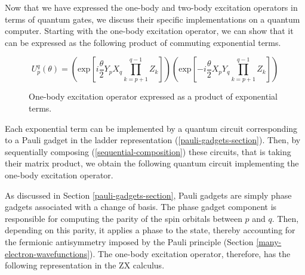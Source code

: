 Now that we have expressed the one-body and two-body excitation operators in terms of quantum gates, we discuss their specific implementations on a quantum computer. Starting with the one-body excitation operator, we can show that it can be expressed as the following product of commuting exponential terms.

\begin{figure}[H]
    \centering
    \begin{equation*}
        U^q_p (\theta) =
        \left( \text{exp} \left[
        i \frac{\theta}{2} Y_p X_q \prod_{k=p+1}^{q-1} Z_k \right] \right)
        \left( \text{exp} \left[ -
        i \frac{\theta}{2} X_p Y_q \prod_{k=p+1}^{q-1} Z_k \right] \right)
    \end{equation*}
    \caption{One-body excitation operator expressed as a product of exponential terms.}
\end{figure}
\vspace{-10pt}

Each exponential term can be implemented by a quantum circuit corresponding to a Pauli gadget in the ladder representation (\ref{pauli-gadgets-section}). Then, by sequentially composing (\ref{sequential-composition}) these circuits, that is taking their matrix product, we obtain the following quantum circuit implementing the one-body excitation operator.






As discussed in Section \ref{pauli-gadgets-section}, Pauli gadgets are simply phase gadgets associated with a change of basis. The phase gadget component is responsible for computing the parity of the spin orbitals between $p$ and $q$. Then, depending on this parity, it applies a phase to the state, thereby accounting for the fermionic antisymmetry imposed by the Pauli principle (Section \ref{many-electron-wavefunctions}). The one-body excitation operator, therefore, has the following representation in the ZX calculus.

